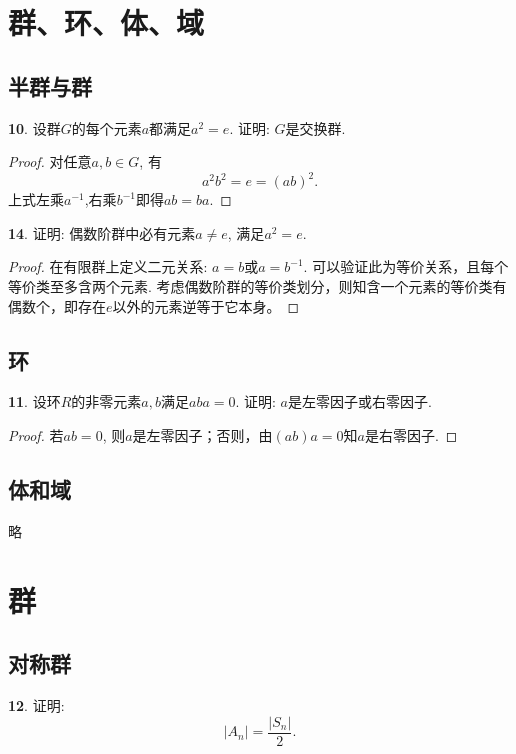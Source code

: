\section{群、环、体、域}

\subsection{半群与群}
\par \textbf{10}. 设群$G$的每个元素$a$都满足$a^2=e$. 证明: $G$是交换群.

\begin{proof}
对任意$a,b\in G$, 有
\begin{equation*}
a^2b^2=e=(ab)^2.
\end{equation*}
上式左乘$a^{-1}$,右乘$b^{-1}$即得$ab=ba$.
\end{proof}

\par \textbf{14}.
证明: 偶数阶群中必有元素$a\neq e$, 满足$a^2=e$.

\begin{proof}
在有限群上定义二元关系: $a=b$或$a=b^{-1}$. 可以验证此为等价关系，且每个等价类至多含两个元素. 考虑偶数阶群的等价类划分，则知含一个元素的等价类有偶数个，即存在$e$以外的元素逆等于它本身。
\end{proof}

\subsection{环}
\par \textbf{11}. 设环$R$的非零元素$a,b$满足$aba=0$. 证明: $a$是左零因子或右零因子.

\begin{proof}
若$ab=0$, 则$a$是左零因子；否则，由$(ab)a=0$知$a$是右零因子.
\end{proof}

\subsection{体和域}
\par 略

\section{群}
\subsection{对称群}

\par \textbf{12}. 证明: 
\begin{displaymath}
|A_n|=\frac{|S_n|}{2}.
\end{displaymath}

